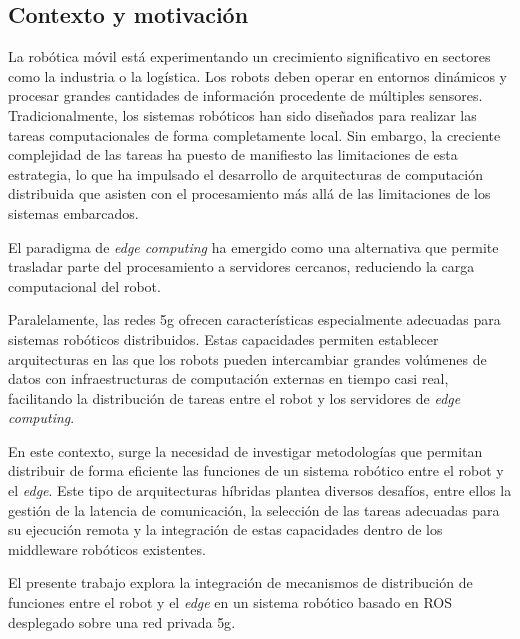 \subsection{Contexto y motivación}
\label{sec:contexto_y_motivacion}

La robótica móvil está experimentando un crecimiento significativo en sectores como la industria o la logística. Los robots deben operar en entornos dinámicos y procesar grandes cantidades de información procedente de múltiples sensores. Tradicionalmente, los sistemas robóticos han sido diseñados para realizar las tareas computacionales de forma completamente local. Sin embargo, la creciente complejidad de las tareas ha puesto de manifiesto las limitaciones de esta estrategia, lo que ha impulsado el desarrollo de arquitecturas de computación distribuida que asisten con el procesamiento más allá de las limitaciones de los sistemas embarcados.

El paradigma de \textit{edge computing} ha emergido como una alternativa que permite trasladar parte del procesamiento a servidores cercanos, reduciendo la carga computacional del robot.

Paralelamente, las redes \gls{5g} ofrecen características especialmente adecuadas para sistemas robóticos distribuidos. Estas capacidades permiten establecer arquitecturas en las que los robots pueden intercambiar grandes volúmenes de datos con infraestructuras de computación externas en tiempo casi real, facilitando la distribución de tareas entre el robot y los servidores de \textit{edge computing}.

En este contexto, surge la necesidad de investigar metodologías que permitan distribuir de forma eficiente las funciones de un sistema robótico entre el robot y el \textit{edge}. Este tipo de arquitecturas híbridas plantea diversos desafíos, entre ellos la gestión de la latencia de comunicación, la selección de las tareas adecuadas para su ejecución remota y la integración de estas capacidades dentro de los middleware robóticos existentes.

El presente trabajo explora la integración de mecanismos de distribución de funciones entre el robot y el \textit{edge} en un sistema robótico basado en ROS desplegado sobre una red privada \gls{5g}.
